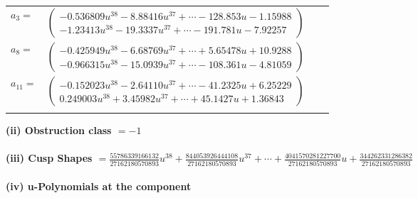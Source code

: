 \documentclass[1p]{elsarticle_modified}
\theoremstyle{definition}
\begin{document}
\begin{tabular}{m{7pt} m{180pt} m{7pt} m{180pt} }
\flushright $a_{3}=$&$\begin{pmatrix}-0.536809 u^{38}-8.88416 u^{37}+\cdots-128.853 u-1.15988\\-1.23413 u^{38}-19.3337 u^{37}+\cdots-191.781 u-7.92257\end{pmatrix}$ \\
\flushright $a_{8}=$&$\begin{pmatrix}-0.425949 u^{38}-6.68769 u^{37}+\cdots+5.65478 u+10.9288\\-0.966315 u^{38}-15.0939 u^{37}+\cdots-108.361 u-4.81059\end{pmatrix}$ \\
\flushright $a_{11}=$&$\begin{pmatrix}-0.152023 u^{38}-2.64110 u^{37}+\cdots-41.2325 u+6.25229\\0.249003 u^{38}+3.45982 u^{37}+\cdots+45.1427 u+1.36843\end{pmatrix}$\\&\end{tabular}
\flushleft \textbf{(ii) Obstruction class $= -1$}\\~\\
\flushleft \textbf{(iii) Cusp Shapes $= \frac{55786339166132}{27162180570893} u^{38}+\frac{844053926444108}{27162180570893} u^{37}+\cdots+\frac{4041570281227700}{27162180570893} u+\frac{344262331286382}{27162180570893}$}\\~\\
\newpage\renewcommand{\arraystretch}{1}
\flushleft \textbf{(iv) u-Polynomials at the component}\newline \\
\end{document}
